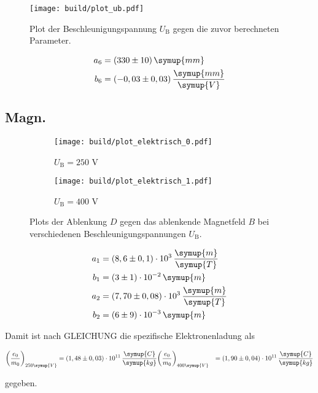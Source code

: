 \begin{figure}
  \centering
  \texttt{[image: build/plot\_ub.pdf]}
  \caption{Plot der Beschleunigungspannung $U_\text{B}$ gegen die zuvor berechneten Parameter.}
  \label{fig:plt-ub}
\end{figure}

\begin{align*}
  a_6 &= (330 \pm 10) \, \symup{mm} \\
  b_6 &= (-0,03 \pm 0,03) \, \frac{\symup{mm}}{\symup{V}}
\end{align*}



\subsection{Magn.}




\begin{figure}
  \centering
  \begin{subfigure}{0.49\textwidth}
    \centering
    \texttt{[image: build/plot\_elektrisch\_0.pdf]}
    \caption{$U_\text{B} = 250$ V}
  \end{subfigure}
  \begin{subfigure}{0.49\textwidth}
    \centering
    \texttt{[image: build/plot\_elektrisch\_1.pdf]}
    \caption{$U_\text{B} = 400$ V}
  \end{subfigure}
  \caption{Plots der Ablenkung $D$ gegen das ablenkende Magnetfeld $B$ bei verschiedenen Beschleunigungspannungen $U_\text{B}$.}
  \label{fig:plot-magnetisch}
\end{figure}


\begin{align*}
  a_1 &= (8,6 \pm 0,1) \cdot 10^{3} \, \frac{\symup{m}}{\symup{T}} \\
  b_1 &= (3 \pm 1) \cdot 10^{-2} \, \symup{m} \\
  a_2 &= (7,70 \pm 0,08) \cdot 10^{3} \, \frac{\symup{m}}{\symup{T}} \\
  b_2 &= (6 \pm 9) \cdot 10^{-3} \, \symup{m}
\end{align*}

Damit ist nach GLEICHUNG die spezifische Elektronenladung als 

\begin{align*}
  \bigg( \frac{e_0}{m_0} \bigg)_{250 \symup{V}} &= (1,48 \pm 0,03) \cdot 10^{11} \, \frac{\symup{C}}{\symup{kg}}
  \bigg( \frac{e_0}{m_0} \bigg)_{400 \symup{V}} &= (1,90 \pm 0,04) \cdot 10^{11} \, \frac{\symup{C}}{\symup{kg}}
\end{align*}

gegeben.